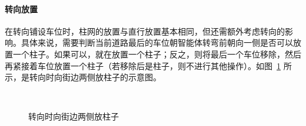\paragraph{转向放置}
在转向铺设车位时，柱网的放置与直行放置基本相同，但还需额外考虑转向的影响。具体来说，需要判断当前道路最后的车位朝智能体转弯前朝向一侧是否可以放置一个柱子。如果可以，就在放置一个柱子；反之，则将最后一个车位移除，然后再紧接着车位放置一个柱子（若移除后是柱子，则不进行其他操作）。如图~\ref{fig:turn_pillar} 所示，是转向时向街边两侧放柱子的示意图。
\begin{figure}[H]
    \centering
	\\
    \caption{\label{fig:turn_pillar}转向时向街边两侧放柱子}
\end{figure}
